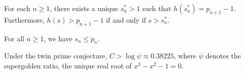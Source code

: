 \documentclass[10pt,a4paper]{amsart}
\begin{document}
\begin{proposition}
\label{prop:existence_sn}
For each $n \geq 1$, there exists a unique $s_n^* > 1$ such that $h(s_n^*) = p_{n+1} - 1$. Furthermore, $h(s) > p_{n+1} - 1$ if and only if $s > s_n^*$.
\end{proposition}

\begin{theorem}
\label{thm:nagura}
For all $n \geq 1$, we have $s_n \leq p_n$.
\end{theorem}

\begin{theorem}
\label{thm:twin}
Under the twin prime conjecture, $C > \log \psi \approx 0.38225$, where $\psi$ denotes the supergolden ratio, the unique real root of $x^3 - x^2 - 1 = 0$.
\end{theorem}
\end{document}
